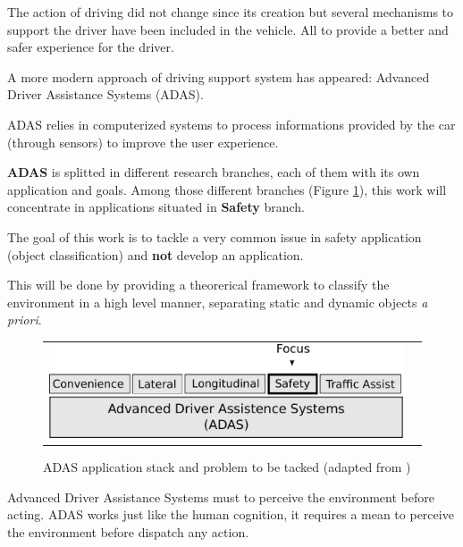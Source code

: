 
The action of driving did not change since its creation but several mechanisms to support the driver have been included in the vehicle. All to provide a better and safer experience for the driver\cite{riener2010sensor}.

A more modern approach of driving support system has appeared: Advanced Driver Assistance Systems (ADAS). 

ADAS relies in computerized systems to process informations provided by the car (through sensors) to improve the user experience. 

\textbf{ADAS} is splitted in different research branches, each of them with its own application and goals. Among those different branches (Figure \ref{fig:sensor:target}), this work will concentrate in applications situated in \textbf{Safety} branch. 

The goal of this work is to tackle a very common issue in safety application (object classification) and \textbf{not} develop an application.

This will be done by providing a theorerical framework to classify the environment in a high level manner, separating static and dynamic objects \textit{a priori}.

\begin{figure}[h]
\centering
	\begin{tabular}{lr}\\
		\includegraphics[scale=0.7]{img/fig:sensor:target} 
	\end{tabular}
	\caption{ADAS application stack and problem to be tacked (adapted from \cite{riener2010sensor})}
	\label{fig:sensor:target}
\end{figure}

Advanced Driver Assistance Systems must to perceive the environment before acting. ADAS works just like the human cognition, it requires a mean to perceive the environment before dispatch any action. 

